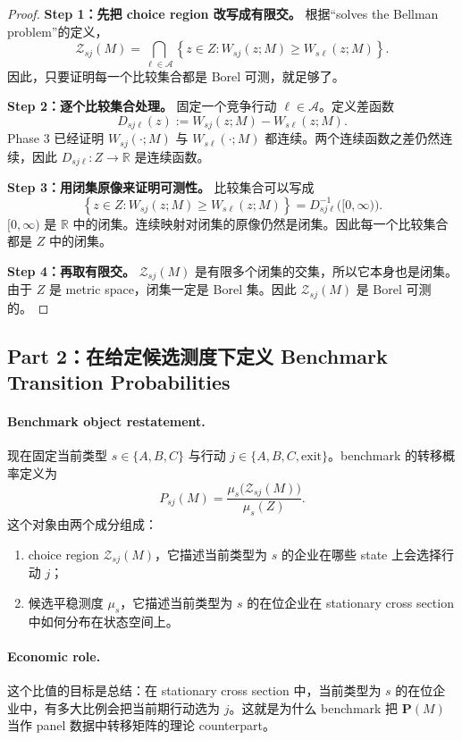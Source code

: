 \begin{proof}
\medskip\noindent\textbf{Step 1：先把 choice region 改写成有限交。}
根据“solves the Bellman problem”的定义，
\[
\mathcal Z_{sj}(M)
=
\bigcap_{\ell\in\mathcal A}
\left\{z\in Z:W_{sj}(z;M)\ge W_{s\ell}(z;M)\right\}.
\]
因此，只要证明每一个比较集合都是 Borel 可测，就足够了。

\medskip\noindent\textbf{Step 2：逐个比较集合处理。}
固定一个竞争行动 $\ell\in\mathcal A$。定义差函数
\[
D_{sj\ell}(z):=W_{sj}(z;M)-W_{s\ell}(z;M).
\]
Phase 3 已经证明 $W_{sj}(\cdot;M)$ 与 $W_{s\ell}(\cdot;M)$ 都连续。两个连续函数之差仍然连续，因此 $D_{sj\ell}:Z\to\mathbb R$ 是连续函数。

\medskip\noindent\textbf{Step 3：用闭集原像来证明可测性。}
比较集合可以写成
\[
\left\{z\in Z:W_{sj}(z;M)\ge W_{s\ell}(z;M)\right\}
=
D_{sj\ell}^{-1}\bigl([0,\infty)\bigr).
\]
$[0,\infty)$ 是 $\mathbb R$ 中的闭集。连续映射对闭集的原像仍然是闭集。因此每一个比较集合都是 $Z$ 中的闭集。

\medskip\noindent\textbf{Step 4：再取有限交。}
$\mathcal Z_{sj}(M)$ 是有限多个闭集的交集，所以它本身也是闭集。由于 $Z$ 是 metric space，闭集一定是 Borel 集。因此 $\mathcal Z_{sj}(M)$ 是 Borel 可测的。
\end{proof}

\subsection{Part 2：在给定候选测度下定义 Benchmark Transition Probabilities}

\paragraph{Benchmark object restatement.}
现在固定当前类型 $s\in\{A,B,C\}$ 与行动 $j\in\{A,B,C,\mathrm{exit}\}$。benchmark 的转移概率定义为
\[
P_{sj}(M)=\frac{\mu_s\bigl(\mathcal Z_{sj}(M)\bigr)}{\mu_s(Z)}.
\]
这个对象由两个成分组成：
\begin{enumerate}
    \item choice region $\mathcal Z_{sj}(M)$，它描述当前类型为 $s$ 的企业在哪些 state 上会选择行动 $j$；
    \item 候选平稳测度 $\mu_s$，它描述当前类型为 $s$ 的在位企业在 stationary cross section 中如何分布在状态空间上。
\end{enumerate}

\paragraph{Economic role.}
这个比值的目标是总结：在 stationary cross section 中，当前类型为 $s$ 的在位企业中，有多大比例会把当前期行动选为 $j$。这就是为什么 benchmark 把 $\mathbf P(M)$ 当作 panel 数据中转移矩阵的理论 counterpart。

